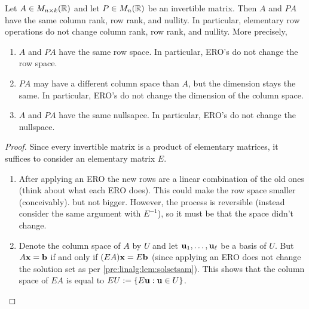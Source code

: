 \documentclass[10pt, a4paper]{article}
\begin{document}
\begin{proposition}\label{pre:linalg:prop:invmatrsameranksandnul}
    Let $A \in M_{n \times k}(\mathbb{R})$ and let $P \in M_{n}(\mathbb{R})$ be an invertible matrix.
    Then $A$ and $PA$ have the same column rank,
    row rank,
    and nullity.
    In particular,
    elementary row operations do not change column rank,
    row rank,
    and nullity.
    More precisely,
    \begin{enumerate}
        \item $A$ and $PA$ have the same row space.
        In particular,
        ERO's do not change the row space.
        \item $PA$ may have a different column space than $A$,
        but the dimension stays the same.
        In particular,
        ERO's do not change the dimension of the column space.
        \item $A$ and $PA$ have the same nullsapce.
        In particular,
        ERO's do not change the nullspace.
    \end{enumerate}

    \begin{proof}
        Since every invertible matrix is a product of elementary matrices,
        it suffices to consider an elementary matrix $E$.
        \begin{enumerate}[label = (\roman*)]
            \item After applying an ERO the new rows are a linear combination of the old ones
            (think about what each ERO does).
            This could make the row space smaller
            (conceivably).
            but not bigger.
            However,
            the process is reversible
            (instead consider the same argument with $E ^ {-1}$),
            so it must be that the space didn't change.
            \item Denote the column space of $A$ by $U$ and let $\mathbf{u}_1, \dotsc, \mathbf{u}_{\ell}$ be a basis of $U$.
            But $A\mathbf{x} = \mathbf{b}$ if and only if $(EA)\mathbf{x} = E\mathbf{b}$
            (since applying an ERO does not change the solution set as per \autoref{pre:linalg:lem:solsetsam}).
            This shows that the column space of $EA$ is equal to $EU := \{E\mathbf{u} : \mathbf{u} \in U\}$.


\end{enumerate}
\end{proof}
\end{proposition}
\end{document}
